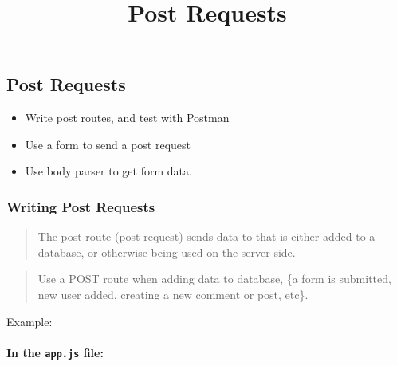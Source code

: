 \documentclass[11pt]{article}
\title{Post Requests}
\providecommand{\tightlist}{%
      \setlength{\itemsep}{0pt}\setlength{\parskip}{0pt}}
\begin{document}
    
    
    \maketitle
    
    

    
    \hypertarget{post-requests}{%
\subsection{Post Requests}\label{post-requests}}

\begin{itemize}
\tightlist
\item
  Write post routes, and test with Postman
\item
  Use a form to send a post request
\item
  Use body parser to get form data.
\end{itemize}

    \hypertarget{writing-post-requests}{%
\subsubsection{Writing Post Requests}\label{writing-post-requests}}

\begin{quote}
The post route (post request) sends data to that is either added to a
database, or otherwise being used on the server-side.
\end{quote}

\begin{quote}
Use a POST route when adding data to database, \{a form is submitted,
new user added, creating a new comment or post, etc\}.
\end{quote}

Example:

\hypertarget{in-the-app.js-file}{%
\paragraph{\texorpdfstring{In the \texttt{app.js}
file:}{In the app.js file:}}\label{in-the-app.js-file}}
\end{document}
